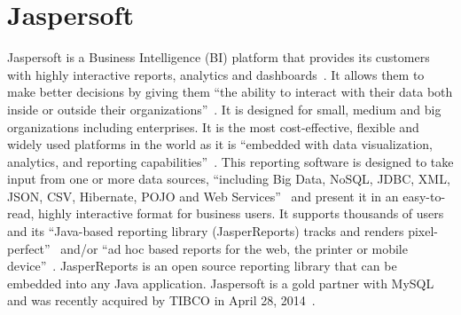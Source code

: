 \section{Jaspersoft}

Jaspersoft is a Business Intelligence (BI) platform that provides its customers
with highly interactive reports, analytics and
dashboards~\cite{hid-sp18-516-finances-online}. It allows them to make better
decisions by giving them ``the ability to interact with their data both inside
or outside their organizations''~\cite{hid-sp18-516-jaspersoft-overview}. It is
designed for small, medium and big organizations including enterprises. It is
the most cost-effective, flexible and widely used platforms in the world as it
is ``embedded with data visualization, analytics, and reporting
capabilities''~\cite{hid-sp18-516-finances-online}. This reporting software is
designed to take input from one or more data sources, ``including Big Data,
NoSQL, JDBC, XML, JSON, CSV, Hibernate, POJO and Web
Services''~\cite{hid-sp18-516-jaspersoft-overview} and present it in an
easy-to-read, highly interactive format for business users. It supports
thousands of users and its ``Java-based reporting library (JasperReports)
tracks and renders pixel-perfect''~\cite{hid-sp18-516-finances-online} and/or
``ad hoc based reports for the web, the printer or mobile
device''~\cite{hid-sp18-516-jaspersoft-overview}. JasperReports is an open
source reporting library that can be embedded into any Java application.
Jaspersoft is a gold partner with MySQL and was recently acquired by TIBCO in
April 28, 2014~\cite{hid-sp18-516-wiki-jasperReports}.

